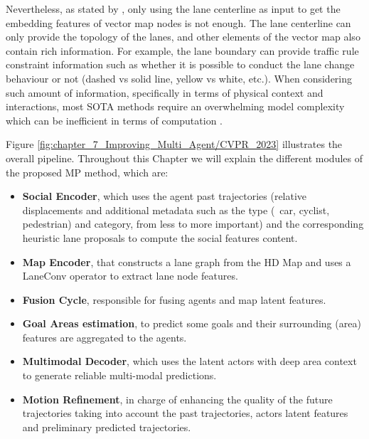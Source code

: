 Nevertheless, as stated by \cite{zhang2022banet}, only using the lane centerline as input to get the embedding features of vector map nodes is not enough. The lane centerline can only provide the topology of the lanes, and other elements of the vector map also contain rich information. For example, the lane boundary can provide traffic rule constraint information such as whether it is possible to conduct the lane change behaviour or not (dashed vs solid line, yellow vs white, etc.). When considering such amount of information, specifically in terms of physical context and interactions, most \ac{SOTA} methods require an overwhelming model complexity which can be inefficient in terms of computation \cite{gao2020vectornet, walters2020trajectory, can2022maps}.

Figure \ref{fig:chapter_7_Improving_Multi_Agent/CVPR_2023} illustrates the overall pipeline. Throughout this Chapter we will explain the different modules of the proposed \ac{MP} method, which are:

\begin{itemize}
	
	\item \textbf{Social Encoder}, which uses the agent past trajectories (relative displacements and additional metadata such as the type (\eg \ car, cyclist, pedestrian) and category, from less to more important) and the corresponding heuristic lane proposals to compute the social features
	content.
	
	\item \textbf{Map Encoder}, that constructs a lane graph from the HD Map and uses a LaneConv operator \cite{liang2020learning} to extract lane node features.
	
	\item \textbf{Fusion Cycle}, responsible for fusing agents and map latent features.
	
	\item \textbf{Goal Areas estimation}, to predict some goals and their surrounding  (area) features are aggregated to the agents.
	
	\item \textbf{Multimodal Decoder}, which uses the latent actors with deep area context to generate reliable multi-modal predictions.
	
	\item \textbf{Motion Refinement}, in charge of enhancing the quality of the future trajectories taking into account the past trajectories, actors latent features and preliminary predicted trajectories.
	
\end{itemize}

